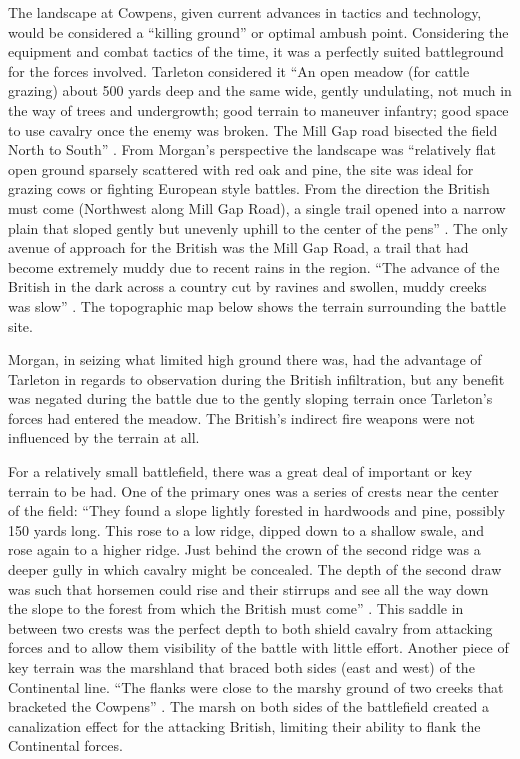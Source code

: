 The landscape at Cowpens, given current advances in tactics and technology,
would be considered a ``killing ground'' or optimal ambush point.  Considering
the equipment and combat tactics of the time, it was a perfectly suited
battleground for the forces involved.  Tarleton considered it ``An open meadow
(for cattle grazing) about 500 yards deep and the same wide, gently undulating,
not much in the way of trees and undergrowth; good terrain to maneuver
infantry; good space to use cavalry once the enemy was broken.  The Mill Gap
road bisected the field North to South'' \cite[326]{stephenson_patriot_2007}.
From Morgan's perspective the landscape was ``relatively flat open ground
sparsely scattered with red oak and pine, the site was ideal for grazing cows
or fighting European style battles.  From the direction the British must come
(Northwest along Mill Gap Road), a single trail opened into a narrow plain that
sloped gently but unevenly uphill to the center of the pens''
\cite[45]{moncure_cowpens_1996}.  The only avenue of approach for the British
was the Mill Gap Road, a trail that had become extremely muddy due to recent
rains in the region. ``The advance of the British in the dark across a country
cut by ravines and swollen, muddy creeks was slow''
\cite[126]{lumpkin_savannah_1981}.  The topographic map below
\cite{wilson_blogmap} shows the terrain surrounding the battle site.  

Morgan, in seizing what limited high ground there was, had the advantage of
Tarleton in regards to observation during the British infiltration, but any
benefit was negated during the battle due to the gently sloping terrain once
Tarleton's forces had entered the meadow.  The British's indirect fire weapons
were not influenced by the terrain at all. 

For a relatively small battlefield, there was a great deal of important or key
terrain to be had.  One of the primary ones was a series of crests near the
center of the field: ``They found a slope lightly forested in hardwoods and
pine, possibly 150 yards long. This rose to a low ridge, dipped down to a
shallow swale, and rose again to a higher ridge.  Just behind the crown of the
second ridge was a deeper gully in which cavalry might be concealed.  The depth
of the second draw was such that horsemen could rise and their stirrups and see
all the way down the slope to the forest from which the British must come''
\cite[126]{lumpkin_savannah_1981}. This saddle in between two crests was the
perfect depth to both shield cavalry from attacking forces and to allow them
visibility of the battle with little effort.   Another piece of key terrain was
the marshland that braced both sides (east and west) of the Continental line.
``The flanks were close to the marshy ground of two creeks that bracketed the
Cowpens'' \cite[327]{stephenson_patriot_2007}.  The marsh on both sides of the
battlefield created a canalization effect for the attacking British, limiting
their ability to flank the Continental forces.  

